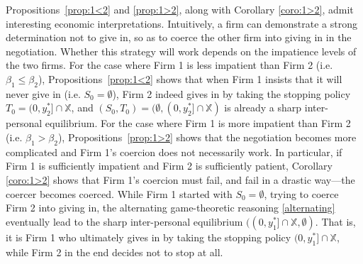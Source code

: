 \documentclass[11pt,reqno]{article}
\numberwithin{equation}{section}
\newcommand{\X}{\mathbb{X}}
\begin{document}
Propositions~\ref{prop:1<2} and \ref{prop:1>2}, along with Corollary \ref{coro:1>2}, admit interesting economic interpretations. Intuitively, a firm can demonstrate a strong determination not to give in, so as to coerce the other firm into giving in in the negotiation. Whether this strategy will work depends on the impatience levels of the two firms. For the case where Firm 1 is less impatient than Firm 2 (i.e. $\beta_1\le \beta_2$), Propositions~\ref{prop:1<2} shows that when Firm 1 insists that it will never give in (i.e. $S_0=\emptyset$), Firm 2 indeed gives in by taking the stopping policy $T_0 = (0,y_2^*]\cap\X$, and $(S_0,T_0) = (\emptyset,(0,y_2^*]\cap\X)$ is already a sharp inter-personal equilibrium. For the case where Firm 1 is more impatient than Firm 2 (i.e. $\beta_1> \beta_2$), Propositions~\ref{prop:1>2} shows that the negotiation becomes more complicated and Firm 1's coercion does not necessarily work. In particular, if Firm 1 is sufficiently impatient and Firm 2 is sufficiently patient, %
Corollary \ref{coro:1>2} shows that Firm 1's coercion must fail, and fail in a drastic way---the coercer becomes coerced. While Firm 1 started with $S_0=\emptyset$, trying to coerce Firm 2 into giving in, the alternating game-theoretic reasoning \eqref{alternating} eventually lead to the sharp inter-personal equilibrium $((0,y_1^*]\cap\X, \emptyset)$. That is, it is Firm 1 who ultimately gives in by taking the stopping policy $(0,y_1^*]\cap\X$, while Firm 2 in the end decides not to stop at all. 







\small


\end{document}
